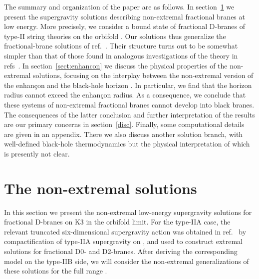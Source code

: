 \documentclass[a4paper,11pt]{article}
\providecommand{\ZZ}{\mathbb{Z}}  \providecommand{\Zint}{\mathbb{Z}}
\begin{document}
The summary and organization of the paper are as follows. In
section~\ref{sect:solutions} we present the supergravity solutions
describing non-extremal fractional branes at low energy. More
precisely, we consider a bound state of \coordHE{} fractional D\coordHE{}-branes of
type-II string theories on the orbifold \myHighlight{$T^4\!/\ZZ_2$}\coordHE{}. Our solutions
thus generalize the fractional-brane solutions of
ref.~\cite{Frau:2000gk}. Their structure turns out to be somewhat
simpler than that of those found in analogous investigations of the
\coordHE{} theory in
refs~\cite{Buchel:2000ch,Buchel:2001gw,Gubser:2001ri}. In
section~\ref{sect:enhancon} we discuss the physical properties of the
non-extremal solutions, focusing on the interplay between the
non-extremal version of the enhan\c{c}on and the black-hole horizon
\coordHE{}. In particular, we find that the horizon radius cannot exceed
the enhan\c{c}on radius. As a consequence, we conclude that these
systems of non-extremal fractional branes cannot develop into black
branes. The consequences of the latter conclusion and further
interpretation of the results are our primary concerns in
section~\ref{disc}. Finally, some computational details are given in
an appendix. There we also discuss another solution branch, with
well-defined black-hole thermodynamics but the physical interpretation
of which is presently not clear.



\vspace{1ex}
\section{The non-extremal solutions}
\label{sect:solutions}

In this section we present the non-extremal low-energy supergravity
solutions for fractional D\coordHE{}-branes on K3 in the \myHighlight{$T^4\!/\ZZ_2$}\coordHE{}
orbifold limit. For the type-IIA case, the relevant truncated
six-dimensional supergravity action was obtained in
ref.~\cite{Frau:2000gk} by compactification of type-IIA supergravity
on \myHighlight{$T^4\!/\ZZ_2$}\coordHE{}, and used to construct extremal solutions for
fractional D0- and D2-branes. After deriving the corresponding model
on the type-IIB side, we will consider the non-extremal generalizations
of these solutions for the full range \coordHE{}.
\end{document}
